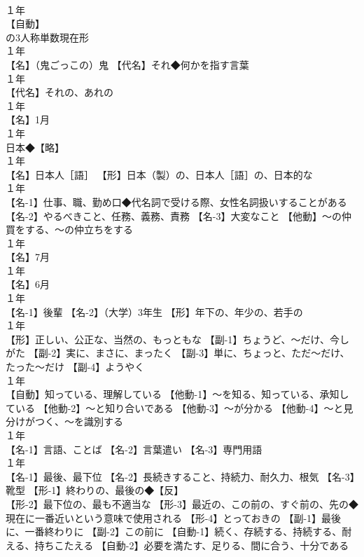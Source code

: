 \documentclass[8pt]{extreport}
\begin{document}
\begin{CJK}{UTF8}{min}
\\	１年	
\\	【自動】
\\	の3人称単数現在形
\\	１年	
\\	【名】（鬼ごっこの）鬼 【代名】それ◆何かを指す言葉
\\	１年	
\\	【代名】それの、あれの
\\	１年	
\\	【名】1月
\\	１年	
\\	日本◆【略】
\\	１年	
\\	【名】日本人［語］ 【形】日本（製）の、日本人［語］の、日本的な
\\	１年	
\\	【名-1】仕事、職、勤め口◆代名詞で受ける際、女性名詞扱いすることがある 【名-2】やるべきこと、任務、義務、責務 【名-3】大変なこと 【他動】～の仲買をする、～の仲立ちをする
\\	１年	
\\	【名】7月
\\	１年	
\\	【名】6月
\\	１年	
\\	【名-1】後輩 【名-2】（大学）3年生 【形】年下の、年少の、若手の
\\	１年	
\\	【形】正しい、公正な、当然の、もっともな 【副-1】ちょうど、～だけ、今しがた 【副-2】実に、まさに、まったく 【副-3】単に、ちょっと、ただ～だけ、たった～だけ 【副-4】ようやく
\\	１年	
\\	【自動】知っている、理解している 【他動-1】～を知る、知っている、承知している 【他動-2】～と知り合いである 【他動-3】～が分かる 【他動-4】～と見分けがつく、～を識別する
\\	１年	
\\	【名-1】言語、ことば 【名-2】言葉遣い 【名-3】専門用語
\\	１年	
\\	【名-1】最後、最下位 【名-2】長続きすること、持続力、耐久力、根気 【名-3】靴型 【形-1】終わりの、最後の◆【反】
\\	【形-2】最下位の、最も不適当な 【形-3】最近の、この前の、すぐ前の、先の◆現在に一番近いという意味で使用される 【形-4】とっておきの 【副-1】最後に、一番終わりに 【副-2】この前に 【自動-1】続く、存続する、持続する、耐える、持ちこたえる 【自動-2】必要を満たす、足りる、間に合う、十分である

\end{CJK}
\end{document}
